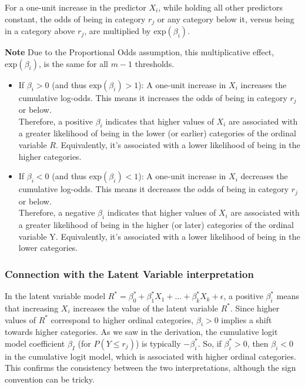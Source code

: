 \documentclass[
  letterpaper,
  DIV=11,
  numbers=noendperiod]{scrartcl}
\begin{document}
For a one-unit increase in the predictor \(X_i\), while holding all
other predictors constant, the odds of being in category \(r_j\) or any
category below it, versus being in a category above \(r_j\), are
multiplied by \(\text{exp}(\beta_i)\).

\textbf{Note} Due to the Proportional Odds assumption, this
multiplicative effect, \(\text{exp}(\beta_i)\), is the same for all
\(m-1\) thresholds.

\begin{itemize}
\item
  If \(\beta_i > 0\) (and thus \(\text{exp}(\beta_i)>1\)): A one-unit
  increase in \(X_i\) increases the cumulative log-odds. This means it
  increases the odds of being in category \(r_j\) or below.\\
  Therefore, a positive \(\beta_i\) indicates that higher values of
  \(X_i\) are associated with a greater likelihood of being in the lower
  (or earlier) categories of the ordinal variable \(R\). Equivalently,
  it's associated with a lower likelihood of being in the higher
  categories.
\item
  If \(\beta_i <0\) (and thus \(\text{exp}(\beta_i)<1\)): A one-unit
  increase in \(X_i\) decreases the cumulative log-odds. This means it
  decreases the odds of being in category \(r_j\) or below.\\
  Therefore, a negative \(\beta_i\) indicates that higher values of
  \(X_i\) are associated with a greater likelihood of being in the
  higher (or later) categories of the ordinal variable Y. Equivalently,
  it's associated with a lower likelihood of being in the lower
  categories.
\end{itemize}

\hypertarget{connection-with-the-latent-variable-interpretation}{%
\subsubsection*{Connection with the Latent Variable
interpretation}\label{connection-with-the-latent-variable-interpretation}}

In the latent variable model
\(R^* = \beta_0^* + \beta_1^*X_1 + \dots + \beta_k^*X_k + \epsilon\), a
positive \(\beta_i^*\) means that increasing \(X_i\) increases the value
of the latent variable \(R^*\). Since higher values of \(R^*\)
correspond to higher ordinal categories, \(\beta_i>0\) implies a shift
towards higher categories. As we saw in the derivation, the cumulative
logit model coefficient \(\beta_I\) (for \(P(Y \leq r_j)\)) is typically
\(-\beta_i^*\). So, if \(\beta_i^*>0\), then \(\beta_i<0\) in the
cumulative logit model, which is associated with higher ordinal
categories. This confirms the consistency between the two
interpretations, although the sign convention can be tricky.
\end{document}
